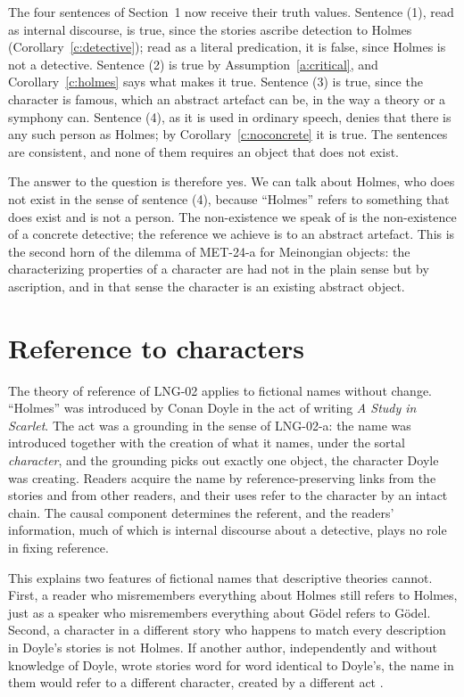 \documentclass{situationist-preprint}
\begin{document}
The four sentences of Section~1 now receive their truth values. Sentence (1), read as internal discourse, is true, since the stories ascribe detection to Holmes (Corollary~\ref{c:detective}); read as a literal predication, it is false, since Holmes is not a detective. Sentence (2) is true by Assumption~\ref{a:critical}, and Corollary~\ref{c:holmes} says what makes it true. Sentence (3) is true, since the character is famous, which an abstract artefact can be, in the way a theory or a symphony can. Sentence (4), as it is used in ordinary speech, denies that there is any such person as Holmes; by Corollary~\ref{c:noconcrete} it is true. The sentences are consistent, and none of them requires an object that does not exist.

The answer to the question is therefore yes. We can talk about Holmes, who does not exist in the sense of sentence (4), because \enquote{Holmes} refers to something that does exist and is not a person. The non-existence we speak of is the non-existence of a concrete detective; the reference we achieve is to an abstract artefact. This is the second horn of the dilemma of MET-24-a for Meinongian objects: the characterizing properties of a character are had not in the plain sense but by ascription, and in that sense the character is an existing abstract object.

\section{Reference to characters}

The theory of reference of LNG-02 applies to fictional names without change. \enquote{Holmes} was introduced by Conan Doyle in the act of writing \emph{A Study in Scarlet}. The act was a grounding in the sense of LNG-02-a: the name was introduced together with the creation of what it names, under the sortal \emph{character}, and the grounding picks out exactly one object, the character Doyle was creating. Readers acquire the name by reference-preserving links from the stories and from other readers, and their uses refer to the character by an intact chain. The causal component determines the referent, and the readers' information, much of which is internal discourse about a detective, plays no role in fixing reference.

This explains two features of fictional names that descriptive theories cannot. First, a reader who misremembers everything about Holmes still refers to Holmes, just as a speaker who misremembers everything about G\"odel refers to G\"odel. Second, a character in a different story who happens to match every description in Doyle's stories is not Holmes. If another author, independently and without knowledge of Doyle, wrote stories word for word identical to Doyle's, the name in them would refer to a different character, created by a different act \citep{Kripke1980,Thomasson1999}.
\end{document}
